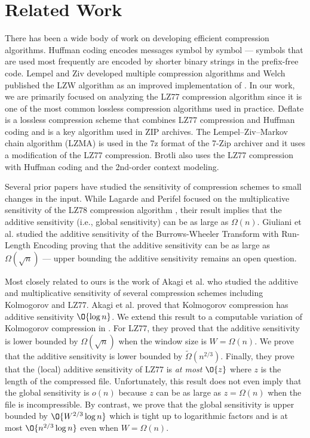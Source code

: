 \section{Related Work}
There has been a wide body of work on developing efficient compression algorithms. Huffman coding \cite{Huffman52} encodes messages symbol by symbol --- symbols that are used most frequently are encoded by shorter binary strings in the prefix-free code. Lempel and Ziv \cite{LZ77,LZ78} developed multiple compression algorithms and Welch \cite{Welch84} published the LZW algorithm as an improved implementation of \cite{LZ78}. In our work, we are primarily focused on analyzing the LZ77 compression algorithm \cite{LZ77} since it is one of the most common lossless compression algorithms used in practice. Deflate \cite{rfc1951} is a lossless compression scheme that combines LZ77 compression \cite{LZ77} and Huffman coding \cite{Huffman52} and is a key algorithm used in ZIP archives. The Lempel–Ziv–Markov chain algorithm (LZMA) is used in the 7z format of the 7-Zip archiver and it uses a modification of the LZ77 compression. Brotli \cite{rfc7932} also uses the LZ77 compression with Huffman coding and the 2nd-order context modeling. 

Several prior papers have studied the sensitivity of compression schemes \cite{lagarde2018lempel,AFI23,GILRSU23} to small changes in the input. While Lagarde and Perifel \cite{lagarde2018lempel} focused on the multiplicative sensitivity of the LZ78 compression algorithm \cite{LZ78}, their result implies that the additive sensitivity (i.e., global sensitivity) can be as large as $\Omega(n)$. Giuliani et al. \cite{GILRSU23} studied the additive sensitivity of the Burrows-Wheeler Transform with Run-Length Encoding proving that the additive sensitivity can be as large as $\Omega(\sqrt{n})$ --- upper bounding the additive sensitivity remains an open question. 

Most closely related to ours is the work of Akagi et al. \cite{AFI23} who studied the additive and multiplicative sensitivity of several compression schemes including Kolmogorov and LZ77. Akagi et al. \cite{AFI23} proved that Kolmogorov compression has additive sensitivity $\O{\log n}$. We extend this result to a computable variation of Kolmogorov compression in . For LZ77, they proved that the additive sensitivity is lower bounded by $\Omega(\sqrt{n})$ when the window size is $W=\Omega(n)$. We prove that the additive sensitivity is lower bounded by $\widetilde\Omega(n^{2/3})$. Finally, they prove that the (local) additive sensitivity of LZ77 is {\em at most} $\O{z}$ where $z$ is the length of the compressed file. Unfortunately, this result does not even imply that the global sensitivity is $o(n)$ because $z$ can be as large as $z= \Omega(n)$ when the file is incompressible. By contrast, we prove that the global sensitivity is upper bounded by $\O{W^{2/3} \log n}$ which is tight up to logarithmic factors and is at most $\O{n^{2/3} \log n}$ even when $W = \Omega(n)$.


